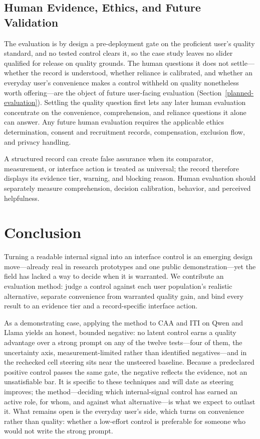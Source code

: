 \documentclass[manuscript,review,anonymous]{acmart}
\begin{document}
\subsection{Human Evidence, Ethics, and Future Validation}\label{human-evidence-ethics-and-future-validation}

The evaluation is by design a pre-deployment gate on the proficient user's quality standard, and no tested control clears it, so the case study leaves no slider qualified for release on quality grounds. The human questions it does not settle---whether the record is understood, whether reliance is calibrated, and whether an everyday user's convenience makes a control withheld on quality nonetheless worth offering---are the object of future user-facing evaluation (Section~\ref{planned-evaluation}). Settling the quality question first lets any later human evaluation concentrate on the convenience, comprehension, and reliance questions it alone can answer. {}%
{}%
Any future human evaluation requires the applicable ethics determination, consent and recruitment records, compensation, exclusion flow, and privacy handling.

A structured record can create false assurance when its comparator, measurement, or interface action is treated as universal; the record therefore displays its evidence tier, warning, and blocking reason. Human evaluation should separately measure comprehension, decision calibration, behavior, and perceived helpfulness. \cite{karny2026neural,bucinca2021trust,bansal2019beyond,li2026learntrust,zhang2020effect,schoeffer2024explanations,kim2025fostering,steyvers2025know}

\section{Conclusion}\label{conclusion}

Turning a readable internal signal into an interface control is an emerging design move---already real in research prototypes and one public demonstration---yet the field has lacked a way to decide when it is warranted. We contribute an evaluation method: judge a control against each user population's realistic alternative, separate convenience from warranted quality gain, and bind every result to an evidence tier and a record-specific interface action.

As a demonstrating case, applying the method to CAA and ITI on Qwen and Llama yields an honest, bounded negative: no latent control earns a quality advantage over a strong prompt on any of the twelve tests---four of them, the uncertainty axis, measurement-limited rather than identified negatives---and in the rechecked cell steering sits near the unsteered baseline. Because a predeclared positive control passes the same gate, the negative reflects the evidence, not an unsatisfiable bar. It is specific to these techniques and will date as steering improves; the method---deciding which internal-signal control has earned an active role, for whom, and against what alternative---is what we expect to outlast it. What remains open is the everyday user's side, which turns on convenience rather than quality: whether a low-effort control is preferable for someone who would not write the strong prompt.
\end{document}
